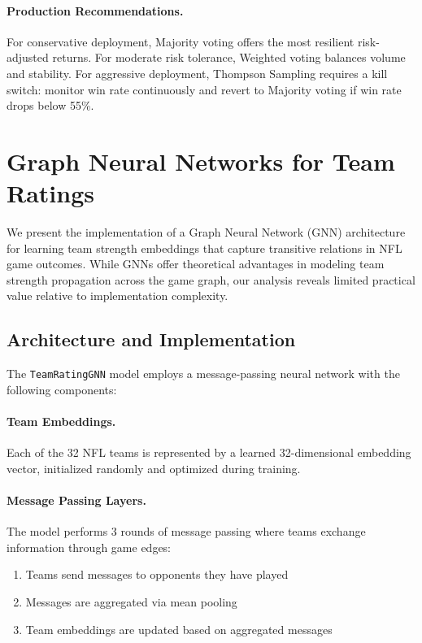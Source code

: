 \paragraph{Production Recommendations.}
For conservative deployment, Majority voting offers the most resilient risk-adjusted returns. For moderate risk tolerance, Weighted voting balances volume and stability. For aggressive deployment, Thompson Sampling requires a kill switch: monitor win rate continuously and revert to Majority voting if win rate drops below 55\%.

\section{Graph Neural Networks for Team Ratings}\label{app:gnn}
We present the implementation of a Graph Neural Network (GNN) architecture for learning team strength embeddings that capture transitive relations in NFL game outcomes. While GNNs offer theoretical advantages in modeling team strength propagation across the game graph, our analysis reveals limited practical value relative to implementation complexity.

\subsection{Architecture and Implementation}
The \texttt{TeamRatingGNN} model employs a message-passing neural network with the following components:

\paragraph{Team Embeddings.}
Each of the 32 NFL teams is represented by a learned 32-dimensional embedding vector, initialized randomly and optimized during training.

\paragraph{Message Passing Layers.}
The model performs 3 rounds of message passing where teams exchange information through game edges:
\begin{enumerate}
  \item Teams send messages to opponents they have played
  \item Messages are aggregated via mean pooling
  \item Team embeddings are updated based on aggregated messages
\end{enumerate}

